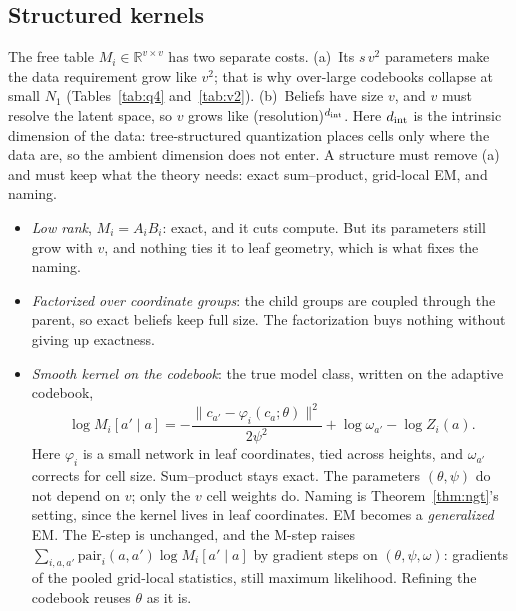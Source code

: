 \documentclass[11pt]{article}
\theoremstyle{definition}
\newcommand{\norm}[1]{\lVert #1\rVert}
\newcommand{\R}{\mathbb R}
\begin{document}
\subsection{Structured kernels}\label{sec:structured}
The free table $M_i\in\R^{v\times v}$ has two separate costs. (a)~Its $s\,v^2$ parameters make the data
requirement grow like $v^2$; that is why over-large codebooks collapse at small $N_1$ (Tables~\ref{tab:q4}
and~\ref{tab:v2}). (b)~Beliefs have size $v$, and $v$ must resolve the latent space, so $v$ grows like
(resolution)$^{d_{\rm int}}$. Here $d_{\rm int}$ is the intrinsic dimension of the data: tree-structured
quantization places cells only where the data are, so the ambient dimension does not enter. A structure
must remove (a) and must keep what the theory needs: exact sum--product, grid-local EM, and naming.
\begin{itemize}
\item \emph{Low rank}, $M_i=A_iB_i$: exact, and it cuts compute. But its parameters still grow with $v$, and
nothing ties it to leaf geometry, which is what fixes the naming.
\item \emph{Factorized over coordinate groups}: the child groups are coupled through the parent, so exact
beliefs keep full size. The factorization buys nothing without giving up exactness.
\item \emph{Smooth kernel on the codebook}: the true model class, written on the adaptive codebook,
\[
\log M_i[a'\mid a]=-\frac{\norm{c_{a'}-\varphi_i(c_a;\theta)}^2}{2\psi^2}+\log\omega_{a'}-\log Z_i(a).
\]
Here $\varphi_i$ is a small network in leaf coordinates, tied across heights, and $\omega_{a'}$ corrects for
cell size. Sum--product stays exact. The parameters $(\theta,\psi)$ do not depend on $v$; only the $v$
cell weights do. Naming is Theorem~\ref{thm:ngt}'s setting, since the kernel lives in leaf coordinates. EM
becomes a \emph{generalized} EM. The E-step is unchanged, and the M-step raises
$\sum_{i,a,a'}\text{pair}_i(a,a')\log M_i[a'\mid a]$ by gradient steps on $(\theta,\psi,\omega)$: gradients of the
pooled grid-local statistics, still maximum likelihood. Refining the codebook reuses $\theta$ as it is.
\end{itemize}
\end{document}
